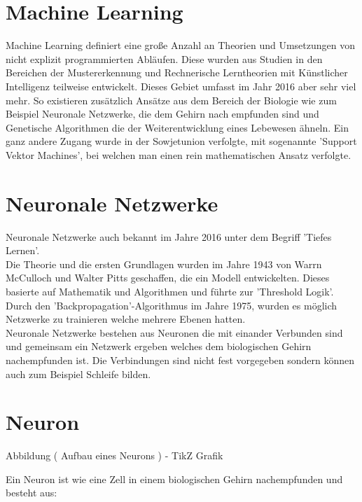 \section{Machine Learning}
\label{sec:Machine Learning}

Machine Learning definiert eine große Anzahl an Theorien und Umsetzungen von nicht explizit programmierten Abläufen. 
Diese wurden aus Studien in den Bereichen der Mustererkennung und Rechnerische Lerntheorien mit Künstlicher Intelligenz teilweise entwickelt. 
Dieses Gebiet umfasst im Jahr 2016 aber sehr viel mehr. 
So existieren zusätzlich Ansätze aus dem Bereich der Biologie wie zum Beispiel Neuronale Netzwerke, die dem Gehirn nach empfunden sind und Genetische Algorithmen die der Weiterentwicklung eines Lebewesen ähneln. 
Ein ganz andere Zugang wurde in der Sowjetunion verfolgte, mit sogenannte 'Support Vektor Machines', bei welchen man einen rein mathematischen Ansatz verfolgte.

\section{Neuronale Netzwerke}

Neuronale Netzwerke auch bekannt im Jahre 2016 unter dem Begriff 'Tiefes Lernen'. \\

Die Theorie und die ersten Grundlagen wurden im Jahre 1943 von Warrn McCulloch und Walter Pitts geschaffen, die ein Modell entwickelten. 
Dieses basierte auf Mathematik und Algorithmen und führte zur 'Threshold Logik'. 
Durch den 'Backpropagation'-Algorithmus im Jahre 1975, wurden es möglich Netzwerke zu trainieren welche mehrere Ebenen hatten. \\

Neuronale Netzwerke bestehen aus Neuronen die mit einander Verbunden sind und gemeinsam ein Netzwerk ergeben welches dem biologischen Gehirn nachempfunden ist. 
Die Verbindungen sind nicht fest vorgegeben sondern können auch zum Beispiel Schleife bilden.


\section{Neuron}

Abbildung ( Aufbau eines Neurons ) - TikZ Grafik

Ein Neuron ist wie eine Zell in einem biologischen Gehirn nachempfunden und besteht aus:
